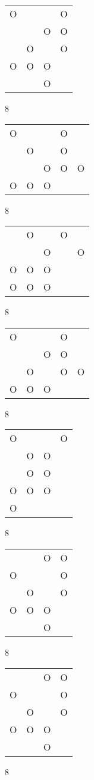 \begin{tabular}{|m{0.2cm}m{0.2cm}m{0.2cm}m{0.2cm}|}\hline
O& & &O\\
 & &O&O\\
 &O& &O\\
O&O&O& \\
 & &O& \\
\hline\end{tabular}8
\begin{tabular}{|m{0.2cm}m{0.2cm}m{0.2cm}m{0.2cm}m{0.2cm}|}\hline
O& & &O& \\
 &O& &O& \\
 & &O&O&O\\
O&O&O& & \\
\hline\end{tabular}8
\begin{tabular}{|m{0.2cm}m{0.2cm}m{0.2cm}m{0.2cm}m{0.2cm}|}\hline
 &O& &O& \\
 & &O& &O\\
O&O&O& & \\
O&O&O& & \\
\hline\end{tabular}8
\begin{tabular}{|m{0.2cm}m{0.2cm}m{0.2cm}m{0.2cm}m{0.2cm}|}\hline
O& & &O& \\
 & &O&O& \\
 &O& &O&O\\
O&O&O& & \\
\hline\end{tabular}8
\begin{tabular}{|m{0.2cm}m{0.2cm}m{0.2cm}m{0.2cm}|}\hline
O& & &O\\
 &O&O& \\
 &O&O& \\
O&O&O& \\
O& & & \\
\hline\end{tabular}8
\begin{tabular}{|m{0.2cm}m{0.2cm}m{0.2cm}m{0.2cm}|}\hline
 & &O&O\\
O& & &O\\
 &O& &O\\
O&O&O& \\
 & &O& \\
\hline\end{tabular}8
\begin{tabular}{|m{0.2cm}m{0.2cm}m{0.2cm}m{0.2cm}|}\hline
 & &O&O\\
O& & &O\\
 &O& &O\\
O&O&O& \\
 & &O& \\
\hline\end{tabular}8
